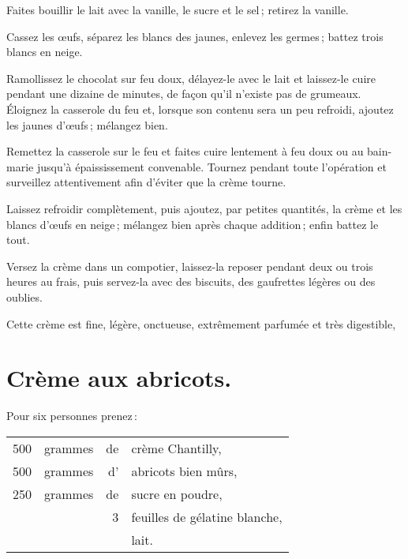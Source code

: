 Faites bouillir le lait avec la vanille, le sucre et le sel ; retirez la
vanille.

Cassez les œufs, séparez les blancs des jaunes, enlevez les germes ; battez trois
blancs en neige.

Ramollissez le chocolat sur feu doux, délayez-le avec le lait et laissez-le
cuire pendant une dizaine de minutes, de façon qu'il n'existe pas de grumeaux.
Éloignez la casserole du feu et, lorsque son contenu sera un peu refroidi,
ajoutez les jaunes d'œufs ; mélangez bien.

Remettez la casserole sur le feu et faites cuire lentement à feu doux ou au
bain-marie jusqu'à épaississement convenable. Tournez pendant toute l'opération
et surveillez attentivement afin d'éviter que la crème tourne.

Laissez refroidir complètement, puis ajoutez, par petites quantités, la crème
et les blancs d'œufs en neige ; mélangez bien après chaque addition ; enfin
battez le tout.

Versez la crème dans un compotier, laissez-la reposer pendant deux ou trois
heures au frais, puis servez-la avec des biscuits, des gaufrettes légères ou
des oublies.

Cette crème est fine, légère, onctueuse, extrêmement parfumée et très digestible,

\section*{\centering Crème aux abricots.}
{}

Pour six personnes prenez :

\footnotesize
\begin{longtable}{rrrp{16em}}
    500 & grammes & de & crème Chantilly,                                                                 \\
    500 & grammes & d' & abricots bien mûrs,                                                              \\
    250 & grammes & de & sucre en poudre,                                                                 \\
        &         &  3 & feuilles de gélatine blanche,                                                    \\
        &         &    & lait.                                                                            \\
\end{longtable}
\normalsize

